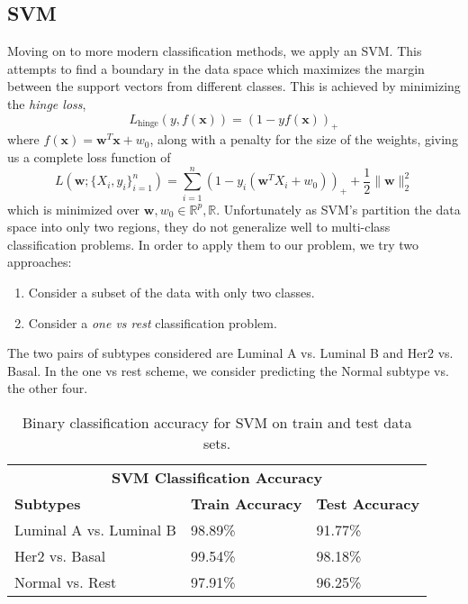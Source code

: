 \documentclass{article}
\begin{document}
\subsection{SVM}
Moving on to more modern classification methods, we apply an SVM. This attempts to find a boundary in the data space which maximizes the margin between the support vectors from different classes. This is achieved by minimizing the \textit{hinge loss}, 
\[ L_{\mbox{hinge}}(y, f(\mathbf{x})) = (1 - yf(\mathbf{x}))_+ \]
where $f(\mathbf{x}) = \mathbf{w}^T \mathbf{x} + w_0$, along with a penalty for the size of the weights, giving us a complete loss function of
\[ L(\mathbf{w}; \{X_i, y_i\}_{i=1}^n) = \sum\limits_{i=1}^n (1 - y_i (\mathbf{w}^TX_i + w_0))_+ + \frac{1}{2}\|\mathbf{w}\|^2_2 \]
which is minimized over $\mathbf{w}, w_0 \in \mathbb{R}^p, \mathbb{R}$. Unfortunately as SVM's partition the data space into only two regions, they do not generalize well to multi-class classification problems. In order to apply them to our problem, we try two approaches:
\begin{enumerate}
\item Consider a subset of the data with only two classes.
\item Consider a \textit{one vs rest} classification problem.
\end{enumerate}
The two pairs of subtypes considered are Luminal A vs. Luminal B and Her2 vs. Basal. In the one vs rest scheme, we consider predicting the Normal subtype vs. the other four.

\begin{table}[t]
  \caption{Binary classification accuracy for SVM on train and test data sets.}
  \label{class_acc_2}
  \centering
  \begin{tabular}{lll}
    \toprule
    \multicolumn{3}{c}{\textbf{SVM Classification Accuracy}}                   \\
    \cmidrule{1-3}
    \textbf{Subtypes}  & \textbf{Train Accuracy}  & \textbf{Test Accuracy}\\
    \midrule
     Luminal A vs. Luminal B & 98.89\% & 91.77\%\\
	 Her2 vs. Basal &  99.54\% & 98.18\%\\
	 Normal vs. Rest & 97.91\% & 96.25\%\\
    \bottomrule
  \end{tabular}
\end{table}
\end{document}
